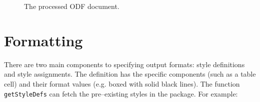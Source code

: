 \documentclass[12pt]{article}
\begin{document}
\begin{figure}[p]
\begin{center}
\end{center}
\caption{\label{figure:after}
The processed ODF document.}
\end{figure}


\section{Formatting}

There are two main components to specifying output formats: style definitions and style assignments. The definition has the specific components (such as a table cell) and their format values (e.g. boxed with solid black lines). The function \texttt{getStyleDefs} can fetch the pre--existing styles in the package. For example:
\begin{Schunk}
\end{Schunk}
\end{document}

